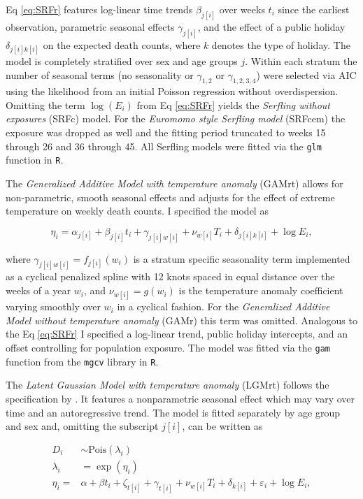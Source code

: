 \documentclass[10pt,letterpaper]{article}
\begin{document}
Eq \ref{eq:SRFr} features log-linear time trends $\beta_{j[i]}$ over weeks $t_i$ since the earliest observation, parametric seasonal effects $\gamma_{j[i]}$, and the effect of a public holiday $\delta_{j[i]k[i]}$ on the expected death counts, where $k$ denotes the type of holiday. The model is completely stratified over sex and age groups $j$. Within each stratum the number of seasonal terms (no seasonality or $\gamma_{1,2}$ or $\gamma_{1,2,3,4}$) were selected via AIC using the likelihood from an initial Poisson regression without overdispersion. Omitting the term $\log(E_i)$ from Eq \ref{eq:SRFr} yields the \emph{Serfling without exposures} (SRFc) model. For the \emph{Euromomo style Serfling model} (SRFcem) the exposure was dropped as well and the fitting period truncated to weeks 15 through 26 and 36 through 45. All Serfling models were fitted via the \texttt{glm} function in \texttt{R}.

The \emph{Generalized Additive Model with temperature anomaly} (GAMrt) allows for non-parametric, smooth seasonal effects and adjusts for the effect of extreme temperature on weekly death counts. I specified the model as

\begin{equation}
  \eta_i = \alpha_{j[i]} + \beta_{j[i]}t_i + \gamma_{j[i]w[i]} + \nu_{w[i]} T_i + \delta_{j[i]k[i]} + \log E_i,
  \label{eq:GAMrt}
\end{equation}

where $\gamma_{j[i]w[i]} = f_{j[i]}(w_i)$ is a stratum specific seasonality term implemented as a cyclical penalized spline with 12 knots spaced in equal distance over the weeks of a year $w_i$, and $\nu_{w[i]}=g(w_i)$ is the temperature anomaly coefficient varying smoothly over $w_i$ in a cyclical fashion. For the \emph{Generalized Additive Model without temperature anomaly} (GAMr) this term was omitted. Analogous to the Eq \ref{eq:SRFr} I specified a log-linear trend, public holiday intercepts, and an offset controlling for population exposure. The model was fitted via the \texttt{gam} function from the \texttt{mgcv} library in \texttt{R}.

The \emph{Latent Gaussian Model with temperature anomaly} (LGMrt) follows the specification by \cite{Kontis2020}. It features a nonparametric seasonal effect which may vary over time and an autoregressive trend. The model is fitted separately by age group and sex and, omitting the subscript $j[i]$, can be written as

\begin{equation}
  \begin{aligned}
    D_i &\sim \text{Pois}(\lambda_i) \\
    \lambda_i &= \exp(\eta_i) \\
    \eta_i =& \alpha + \beta t_i +
    \zeta_{t[i]} + \gamma_{t[i]} +
    \nu_{w[i]} T_i + \delta_{k[i]} + \varepsilon_i + \log E_i,
  \end{aligned}
  \label{eq:LGMrt}
\end{equation}
\end{document}
